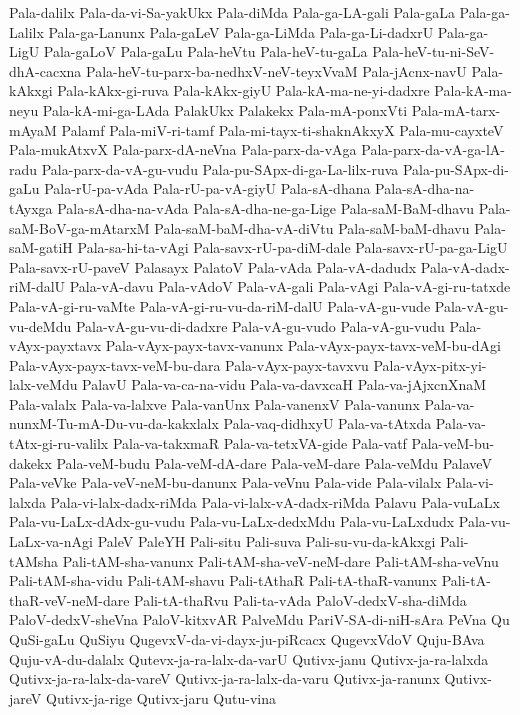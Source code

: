 {Pala-dalilx
Pala-da-vi-Sa-yakUkx
Pala-diMda
Pala-ga-LA-gali
Pala-gaLa
Pala-ga-Lalilx
Pala-ga-Lanunx
Pala-gaLeV
Pala-ga-LiMda
Pala-ga-Li-dadxrU
Pala-ga-LigU
Pala-gaLoV
Pala-gaLu
Pala-heVtu
Pala-heV-tu-gaLa
Pala-heV-tu-ni-SeV-dhA-cacxna
Pala-heV-tu-parx-ba-nedhxV-neV-teyxVvaM
Pala-jAcnx-navU
Pala-kAkxgi
Pala-kAkx-gi-ruva
Pala-kAkx-giyU
Pala-kA-ma-ne-yi-dadxre
Pala-kA-ma-neyu
Pala-kA-mi-ga-LAda
PalakUkx
Palakekx
Pala-mA-ponxVti
Pala-mA-tarx-mAyaM
Palamf
Pala-miV-ri-tamf
Pala-mi-tayx-ti-shaknAkxyX
Pala-mu-cayxteV
Pala-mukAtxvX
Pala-parx-dA-neVna
Pala-parx-da-vAga
Pala-parx-da-vA-ga-lA-radu
Pala-parx-da-vA-gu-vudu
Pala-pu-SApx-di-ga-La-lilx-ruva
Pala-pu-SApx-di-gaLu
Pala-rU-pa-vAda
Pala-rU-pa-vA-giyU
Pala-sA-dhana
Pala-sA-dha-na-tAyxga
Pala-sA-dha-na-vAda
Pala-sA-dha-ne-ga-Lige
Pala-saM-BaM-dhavu
Pala-saM-BoV-ga-mAtarxM
Pala-saM-baM-dha-vA-diVtu
Pala-saM-baM-dhavu
Pala-saM-gatiH
Pala-sa-hi-ta-vAgi
Pala-savx-rU-pa-diM-dale
Pala-savx-rU-pa-ga-LigU
Pala-savx-rU-paveV
Palasayx
PalatoV
Pala-vAda
Pala-vA-dadudx
Pala-vA-dadx-riM-dalU
Pala-vA-davu
Pala-vAdoV
Pala-vA-gali
Pala-vAgi
Pala-vA-gi-ru-tatxde
Pala-vA-gi-ru-vaMte
Pala-vA-gi-ru-vu-da-riM-dalU
Pala-vA-gu-vude
Pala-vA-gu-vu-deMdu
Pala-vA-gu-vu-di-dadxre
Pala-vA-gu-vudo
Pala-vA-gu-vudu
Pala-vAyx-payxtavx
Pala-vAyx-payx-tavx-vanunx
Pala-vAyx-payx-tavx-veM-bu-dAgi
Pala-vAyx-payx-tavx-veM-bu-dara
Pala-vAyx-payx-tavxvu
Pala-vAyx-pitx-yi-lalx-veMdu
PalavU
Pala-va-ca-na-vidu
Pala-va-davxcaH
Pala-va-jAjxcnXnaM
Pala-valalx
Pala-va-lalxve
Pala-vanUnx
Pala-vanenxV
Pala-vanunx
Pala-va-nunxM-Tu-mA-Du-vu-da-kakxlalx
Pala-vaq-didhxyU
Pala-va-tAtxda
Pala-va-tAtx-gi-ru-valilx
Pala-va-takxmaR
Pala-va-tetxVA-gide
Pala-vatf
Pala-veM-bu-dakekx
Pala-veM-budu
Pala-veM-dA-dare
Pala-veM-dare
Pala-veMdu
PalaveV
Pala-veVke
Pala-veV-neM-bu-danunx
Pala-veVnu
Pala-vide
Pala-vilalx
Pala-vi-lalxda
Pala-vi-lalx-dadx-riMda
Pala-vi-lalx-vA-dadx-riMda
Palavu
Pala-vuLaLx
Pala-vu-LaLx-dAdx-gu-vudu
Pala-vu-LaLx-dedxMdu
Pala-vu-LaLxdudx
Pala-vu-LaLx-va-nAgi
PaleV
PaleYH
Pali-situ
Pali-suva
Pali-su-vu-da-kAkxgi
Pali-tAMsha
Pali-tAM-sha-vanunx
Pali-tAM-sha-veV-neM-dare
Pali-tAM-sha-veVnu
Pali-tAM-sha-vidu
Pali-tAM-shavu
Pali-tAthaR
Pali-tA-thaR-vanunx
Pali-tA-thaR-veV-neM-dare
Pali-tA-thaRvu
Pali-ta-vAda
PaloV-dedxV-sha-diMda
PaloV-dedxV-sheVna
PaloV-kitxvAR
PalveMdu
PariV-SA-di-niH-sAra
PeVna
Qu
QuSi-gaLu
QuSiyu
QugevxV-da-vi-dayx-ju-piRcacx
QugevxVdoV
Quju-BAva
Quju-vA-du-dalalx
Qutevx-ja-ra-lalx-da-varU
Qutivx-janu
Qutivx-ja-ra-lalxda
Qutivx-ja-ra-lalx-da-vareV
Qutivx-ja-ra-lalx-da-varu
Qutivx-ja-ranunx
Qutivx-jareV
Qutivx-ja-rige
Qutivx-jaru
Qutu-vina
}
